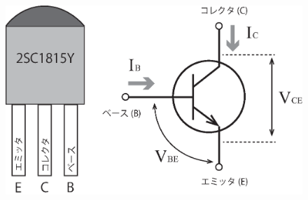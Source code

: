 \documentclass[uplatex,a4paper,11pt,oneside,openany]{jsbook}
\begin{document}

\begin{figure}[H]
	\centering
	\includegraphics[keepaspectratio, scale=0.6, angle=0]
	{figs/eps/illust.eps}
	\label{fig:illust}
\end{figure}

\newpage
\end{document}
